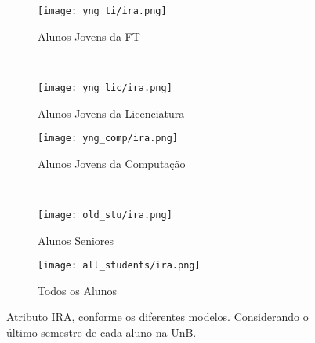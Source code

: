 \clearpage
\begin{figure}[!ht]
    \centering
    \begin{subfigure}[b]{0.48\textwidth}
        \centering
        \texttt{[image: yng\_ti/ira.png]}
        \caption{Alunos Jovens da FT}
    \end{subfigure}
    ~
    \begin{subfigure}[b]{0.48\textwidth}
        \centering
        \texttt{[image: yng\_lic/ira.png]}
        \caption{Alunos Jovens da Licenciatura}
    \end{subfigure}

    \begin{subfigure}[b]{0.48\textwidth}
        \centering
        \texttt{[image: yng\_comp/ira.png]}
        \caption{Alunos Jovens da Computação}
    \end{subfigure}
    ~
    \begin{subfigure}[b]{0.48\textwidth}
        \centering
        \texttt{[image: old\_stu/ira.png]}
        \caption{Alunos Seniores}
    \end{subfigure}

    \begin{subfigure}[b]{0.48\textwidth}
        \centering
        \texttt{[image: all\_students/ira.png]}
        \caption{Todos os Alunos}
    \end{subfigure}
    \caption{Atributo IRA, conforme os diferentes modelos. Considerando o último
    semestre de cada aluno na UnB.}
\end{figure}

